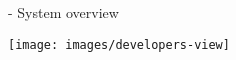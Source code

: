 
\section{\DSU}
\ShowTOC[]

\begin{frame}{\DSU{} - System overview}%
\begin{center}%
\texttt{[image: images/developers-view]}%
\end{center}%
\end{frame}


\newcommand{\removed}[1]{\textcolor{red}{- #1}}
\newcommand{\addedxx}[1]{\textcolor{OliveGreen}{+ #1}}

